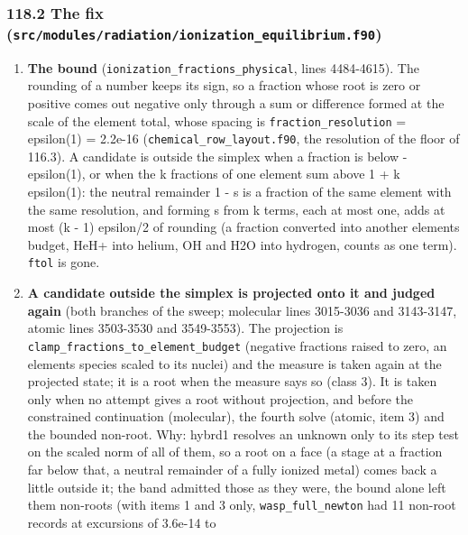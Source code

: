 \documentclass[english,a4paper]{my_memo}
\providecommand{\tightlist}{\setlength{\itemsep}{0pt}\setlength{\parskip}{0pt}}
\begin{document}
\subsubsection{\texorpdfstring{118.2 The fix (\texttt{src/modules/radiation/ionization\_equilibrium.f90})}{118.2 The fix (src/modules/radiation/ionization\_equilibrium.f90)}}\label{1182-the-fix-srcmodulesradiationionization_equilibriumf90}

\begin{enumerate}
\def\labelenumi{\arabic{enumi}.}
\tightlist
\item
  \textbf{The bound} (\texttt{ionization\_fractions\_physical}, lines 4484-4615). The
  rounding of a number keeps its sign, so a fraction whose root is zero or
  positive comes out negative only through a sum or difference formed at
  the scale of the element total, whose spacing is \texttt{fraction\_resolution} =
  epsilon(1) = 2.2e-16 (\texttt{chemical\_row\_layout.f90}, the resolution of the
  floor of 116.3). A candidate is outside the simplex when a fraction is
  below -epsilon(1), or when the k fractions of one element sum above
  1 + k epsilon(1): the neutral remainder 1 - s is a fraction of the same
  element with the same resolution, and forming s from k terms, each at most
  one, adds at most (k - 1) epsilon/2 of rounding (a fraction converted into
  another element\textquotesingle s budget, HeH+ into helium, OH and H2O into hydrogen,
  counts as one term). \texttt{ftol} is gone.
\item
  \textbf{A candidate outside the simplex is projected onto it and judged again}
  (both branches of the sweep; molecular lines 3015-3036 and 3143-3147,
  atomic lines 3503-3530 and 3549-3553). The projection is
  \texttt{clamp\_fractions\_to\_element\_budget} (negative fractions raised to zero, an
  element\textquotesingle s species scaled to its nuclei) and the measure is taken again at
  the projected state; it is a root when the measure says so (class 3). It
  is taken only when no attempt gives a root without projection, and before
  the constrained continuation (molecular), the fourth solve (atomic, item 3)
  and the bounded non-root. Why: hybrd1 resolves an unknown only to its step
  test on the scaled norm of all of them, so a root on a face (a stage at a
  fraction far below that, a neutral remainder of a fully ionized metal)
  comes back a little outside it; the band admitted those as they were, the
  bound alone left them non-roots (with items 1 and 3 only,
  \texttt{wasp\_full\_newton} had 11 non-root records at excursions of 3.6e-14 to

\end{enumerate}
\end{document}
